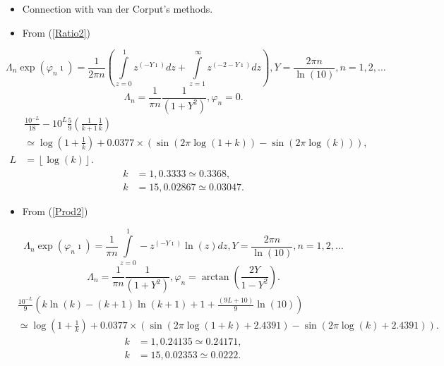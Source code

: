 \documentclass[titlepage,fleqn]{article}%
\begin{document}
\begin{itemize}
\item Connection with van der Corput's methods.

\item From (\ref{Ratio2})
\end{itemize}

%

\[
\Lambda_{n}\exp(\varphi_{n}\imath)=\frac{1}{2\pi n}\left(
{\displaystyle\int\limits_{z=0}^{\ 1}}
z^{(-Y\imath)}dz+%
{\displaystyle\int\limits_{z=1}^{\ \infty}}
z^{(-2-Y\imath)}dz\right)  ,Y=\frac{2\pi n}{\ln(10)},n=1,2,\ldots
\]%
\[
\Lambda_{n}=\frac{1}{\pi n}\frac{1}{(1+Y^{2})},\varphi_{n}=0.
\]%
\begin{align}
&  \frac{10^{-L}}{18}-10^{L}\frac{5}{9}\left(  \frac{1}{k+1}\frac{1}{k}\right)
\label{Ratio3}\\
&  \simeq\log\left(  1+\frac{1}{k}\right)  +0.0377\times\left(  \sin\left(
2\pi\log(1+k)\right)  -\sin\left(  2\pi\log(k)\right)  \right)  ,\nonumber\\
L  &  =\left\lfloor \log(k)\right\rfloor .\nonumber
\end{align}%
\begin{align*}
k  &  =1,0.3333\simeq0.3368,\\
k  &  =15,0.02867\simeq0.03047.
\end{align*}


\begin{itemize}
\item From (\ref{Prod2})
\end{itemize}

%

\[
\Lambda_{n}\exp(\varphi_{n}\imath)=\frac{1}{\pi n}%
{\displaystyle\int\limits_{z=0}^{1}}
-z^{(-Y\imath)}\ln(z)dz,Y=\frac{2\pi n}{\ln(10)},n=1,2,\ldots
\]%
\[
\Lambda_{n}=\frac{1}{\pi n}\frac{1}{(1+Y^{2})},\varphi_{n}=\arctan\left(
\frac{2Y}{1-Y^{2}}\right)  .
\]%
\begin{align}
&  \frac{10^{-L}}{9}\left(  k\ln(k)-(k+1)\ln(k+1)+1+\frac{(9L+10)}{9}%
\ln(10)\right) \label{Prod3}\\
&  \simeq\log\left(  1+\frac{1}{k}\right)  +0.0377\times\left(  \sin\left(
2\pi\log(1+k)+2.4391\right)  -\sin\left(  2\pi\log(k)+2.4391\right)  \right)
.\nonumber
\end{align}%
\begin{align*}
k  &  =1,0.24135\simeq0.24171,\\
k  &  =15,0.02353\simeq0.0222.
\end{align*}
\end{document}
